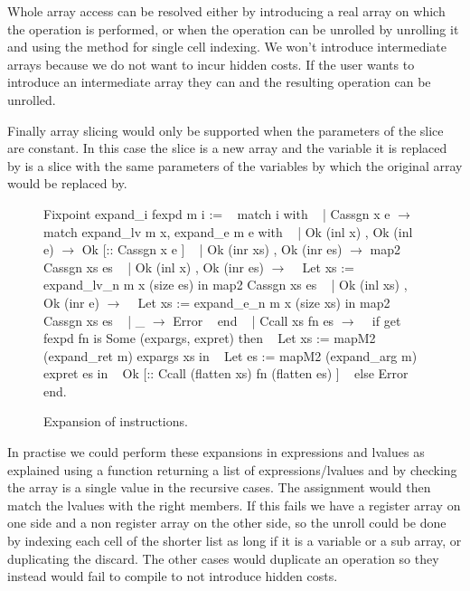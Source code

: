 \documentclass{article}
\begin{document}
Whole array access can be resolved either by introducing a real array on which
the operation is performed, or when the operation can be unrolled by unrolling
it and using the method for single cell indexing. We won't introduce
intermediate arrays because we do not want to incur hidden costs. If the user
wants to introduce an intermediate array they can and the resulting operation
can be unrolled.

Finally array slicing would only be supported when the parameters of the slice
are constant. In this case the slice is a new array and the variable it is
replaced by is a slice with the same parameters of the variables by which the
original array would be replaced by.

\smallskip

\begin{figure}[t]
\obeylines\obeyspaces\ttfamily%
Fixpoint expand\_i fexpd m i :=
~ match i with
~ | Cassgn x e \(\rightarrow\)
~   match expand\_lv m x, expand\_e m e     with
~   | Ok (inl x)       , Ok (inl e)       \(\rightarrow\) Ok [:: Cassgn x e ]
~   | Ok (inr xs)      , Ok (inr es)      \(\rightarrow\) map2 Cassgn xs es
~   | Ok (inl x)       , Ok (inr es)      \(\rightarrow\)
~     Let xs := expand\_lv\_n m x (size es) in map2 Cassgn xs es
~   | Ok (inl xs)      , Ok (inr e)       \(\rightarrow\)
~     Let xs := expand\_e\_n  m x (size xs) in map2 Cassgn xs es
~   | \_                                   \(\rightarrow\) Error
~   end
~ | Ccall xs fn es \(\rightarrow\)
~   if get fexpd fn is Some (expargs, expret) then
~     Let xs := mapM2 (expand\_ret m) expargs xs in
~     Let es := mapM2 (expand\_arg m) expret  es in
~     Ok [:: Ccall (flatten xs) fn (flatten es) ]
~   else Error
~ end.
\normalfont%
\caption{Expansion of instructions.}
\end{figure}

In practise we could perform these expansions in expressions and lvalues
as explained using a function returning a list of expressions/lvalues and
by checking the array is a single value in the recursive cases. The assignment
would then match the lvalues with the right members. If this fails we have
a register array on one side and a non register array on the other side, so the
unroll could be done by indexing each cell of the shorter list as long if it is
a variable or a sub array, or duplicating the discard. The other cases would
duplicate an operation so they instead would fail to compile to not introduce
hidden costs.

\medskip
\end{document}
